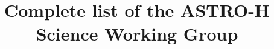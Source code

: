 \usepackage{ascmac}
\usepackage{amsmath}
\usepackage{amssymb}
\usepackage{bm}
\usepackage[footnotesize,bf]{caption}
\usepackage{fullpage}
\usepackage{color}
\usepackage{float}
\usepackage{graphicx}
\usepackage[]{natbib}
\usepackage{subfigure}
\usepackage{txfonts}
\usepackage{threeparttable}
\usepackage{wrapfig}
\setcounter{tocdepth}{3}
\usepackage[]{multicol}
\usepackage{wrapfig}
\usepackage{authblk}
\renewcommand{\Authfont}{\small}
\renewcommand{\Affilfont}{\footnotesize}
\usepackage{floatflt}

\textheight=241mm
\textwidth=170mm
\topmargin=-3mm
\oddsidemargin=-5mm
\evensidemargin=-5mm
\parindent 10pt

\title{\large Complete list of the ASTRO-H Science Working Group}
\date{\vspace{-0.5cm}}
\newcommand{\MakeWhitePaperTitle}{
	\begin{center}
		\begin{figure}
			\vspace{1cm}
			\begin{center}
				\texttt{[image: ASTRO-H\_logo\_small.png]}
			\end{center}
		\end{figure}
		\vspace{1cm}
		{\LARGE
		ASTRO-H Space X-ray Observatory\\
		White Paper\\
		}
		\vspace{5mm}
		{\large
		\WhitePaperTitle\\
		}
		\vspace{1cm}
		{
		\WhitePaperAuthors\\
		on behalf of the ASTRO-H Science Working Group
		}
	\end{center}
}
